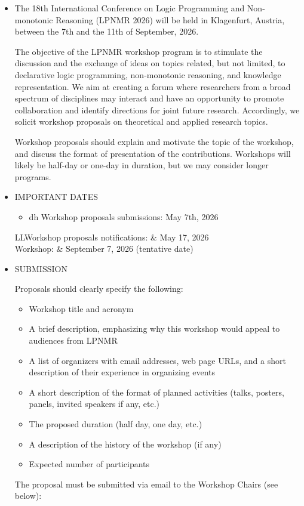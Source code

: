 \documentclass[prodmode,acmtecs]{acmsmall} %
\begin{document}
\begin{itemize}\item  The 18th International Conference on Logic Programming and Non-monotonic Reasoning (LPNMR 2026) will be held in Klagenfurt, Austria, between the 7th and the 11th of September, 2026. 
 
  The objective of the LPNMR workshop program is to stimulate the discussion and the exchange of ideas on topics related, but not limited, to declarative logic programming, non-monotonic reasoning, and knowledge representation. We aim at creating a forum where researchers from a broad spectrum of disciplines may interact and have an opportunity to promote collaboration and identify directions for joint future research. Accordingly, we solicit workshop proposals on theoretical and applied research topics. 
 
  Workshop proposals should explain and motivate the topic of the workshop, and discuss the format of presentation of the contributions. Workshops will likely be half-day or one-day in duration, but we may consider longer programs. 
 
\item  IMPORTANT DATES 
 
\begin{itemize}\item  dh Workshop proposals submissions: May 7th, 2026
\end{itemize} 
\begin{tabulary}{\linewidth}{LL}Workshop proposals notifications:  & May 17, 2026 \\
Workshop:  & September 7, 2026 (tentative date) \\
\end{tabulary}
 
\item  SUBMISSION 
 
  Proposals should clearly specify the following: 
 
\begin{itemize}\item  Workshop title and acronym
\item  A brief description, emphasizing why this workshop would appeal to audiences from LPNMR
\item  A list of organizers with email addresses, web page URLs, and a short description of their experience in organizing events
\item  A short description of the format of planned activities (talks, posters, panels, invited speakers if any, etc.)
\item  The proposed duration (half day, one day, etc.)
\item  A description of the history of the workshop (if any)
\item  Expected number of participants
\end{itemize} 
  The proposal must be submitted via email to the Workshop Chairs (see below): 
 

\end{itemize}
\end{document}
